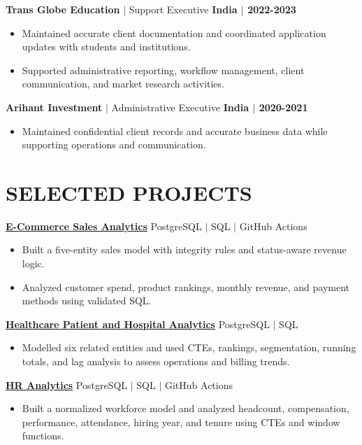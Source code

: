 \documentclass[letterpaper,10pt]{article}
\newcommand{\role}[4]{\textbf{#1} $\vert$ #2 \hfill \textbf{#3 $\vert$ #4}\par\vspace{-1pt}}
\newcommand{\project}[2]{\textbf{#1} \hfill #2\par\vspace{-1pt}}
\begin{document}
\role{Trans Globe Education}{Support Executive}{India}{2022-2023}
\begin{itemize}
  \item Maintained accurate client documentation and coordinated application updates with students and institutions.
  \item Supported administrative reporting, workflow management, client communication, and market research activities.
\end{itemize}

\role{Arihant Investment}{Administrative Executive}{India}{2020-2021}
\begin{itemize}
  \item Maintained confidential client records and accurate business data while supporting operations and communication.
\end{itemize}

\section*{SELECTED PROJECTS}
\project{\href{https://github.com/jainalimehta/Ecommerce-Sales-Analytics}{E-Commerce Sales Analytics}}{PostgreSQL $\vert$ SQL $\vert$ GitHub Actions}
\begin{itemize}
  \item Built a five-entity sales model with integrity rules and status-aware revenue logic.
  \item Analyzed customer spend, product rankings, monthly revenue, and payment methods using validated SQL.
\end{itemize}

\project{\href{https://github.com/jainalimehta/Healthcare-Analytics}{Healthcare Patient and Hospital Analytics}}{PostgreSQL $\vert$ SQL}
\begin{itemize}
  \item Modelled six related entities and used CTEs, rankings, segmentation, running totals, and lag analysis to assess operations and billing trends.
\end{itemize}

\project{\href{https://github.com/jainalimehta/HR-Analytics}{HR Analytics}}{PostgreSQL $\vert$ SQL $\vert$ GitHub Actions}
\begin{itemize}
  \item Built a normalized workforce model and analyzed headcount, compensation, performance, attendance, hiring year, and tenure using CTEs and window functions.
\end{itemize}
\end{document}
